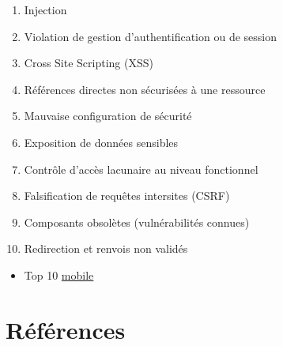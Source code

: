 \begin{enumerate}
\def\labelenumi{\arabic{enumi}.}
\tightlist
\item
  Injection
\item
  Violation de gestion d'authentification ou de session
\item
  Cross Site Scripting (XSS)
\item
  Références directes non sécurisées à une ressource
\item
  Mauvaise configuration de sécurité
\item
  Exposition de données sensibles
\item
  Contrôle d'accès lacunaire au niveau fonctionnel
\item
  Falsification de requêtes intersites (CSRF)
\item
  Composants obsolètes (vulnérabilités connues)
\item
  Redirection et renvois non validés
\end{enumerate}

\begin{itemize}
\tightlist
\item
  Top 10
  \href{https://www.owasp.org/index.php/Mobile_Top_10_2016-Top_10}{mobile}
\end{itemize}

\hypertarget{ruxe9fuxe9rences}{%
\section{Références}\label{ruxe9fuxe9rences}}

